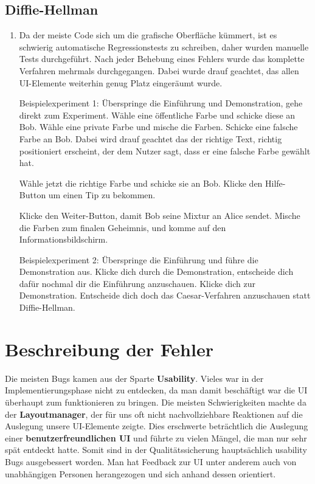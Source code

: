 \documentclass{article}
\begin{document}
  \subsection{Diffie-Hellman}
  \begin{enumerate}
      \item Da der meiste Code sich um die grafische Oberfläche kümmert, ist es schwierig
          automatische Regressionstests zu schreiben, daher wurden manuelle Tests durchgeführt.
          Nach jeder Behebung eines Fehlers wurde das komplette Verfahren mehrmals durchgegangen.
          Dabei wurde drauf geachtet, das allen UI-Elemente weiterhin genug Platz eingeräumt wurde.

          Beispielexperiment 1:
          Überspringe die Einführung und Demonstration, gehe direkt zum Experiment.
          Wähle eine öffentliche Farbe und schicke diese an Bob.
          Wähle eine private Farbe und mische die Farben. Schicke eine falsche
          Farbe an Bob. Dabei wird drauf geachtet das der richtige Text, richtig positioniert
          erscheint, der dem Nutzer sagt, dass er eine falsche Farbe gewählt hat.

          Wähle jetzt die richtige Farbe und schicke sie an Bob.
          Klicke den Hilfe-Button um einen Tip zu bekommen.
          
          Klicke den Weiter-Button, damit Bob seine Mixtur an Alice sendet.
          Mische die Farben zum finalen Geheimnis, und komme auf den Informationsbildschirm.

          Beispielexperiment 2:
          Überspringe die Einführung und führe die Demonstration aus.
          Klicke dich durch die Demonstration, entscheide dich dafür
          nochmal dir die Einführung anzuschauen. Klicke dich zur Demonstration.
          Entscheide dich doch das Caesar-Verfahren anzuschauen statt Diffie-Hellman.
      \end{enumerate}


\section{Beschreibung der Fehler}
  Die meisten Bugs kamen aus der Sparte \textbf{Usability}. Vieles war in der Implementierungsphase nicht zu entdecken, da man damit beschäftigt
  war die UI überhaupt zum funktionieren zu bringen. Die meisten Schwierigkeiten machte da der \textbf{Layoutmanager}, der für uns oft nicht
  nachvollziehbare Reaktionen auf die Auslegung unsere UI-Elemente zeigte.\newline 
  Dies erschwerte beträchtlich die Auslegung einer \textbf{benutzerfreundlichen UI} und führte zu vielen Mängel, die man
  nur sehr spät entdeckt hatte. Somit sind in der Qualitätssicherung hauptsächlich usability Bugs ausgebessert worden. 
  Man hat Feedback zur UI unter anderem auch von unabhängigen Personen herangezogen und sich anhand dessen orientiert. 
  
\end{document}
